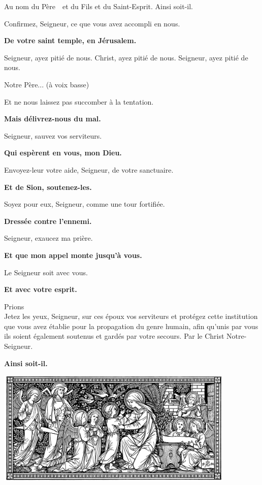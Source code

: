


\vspace*{0.5cm}
Au nom du Père~\x\ et du Fils et du Saint-Esprit. Ainsi soit-il.

\V Confirmez, Seigneur, ce que vous avez accompli en nous.

\R \textbf{De votre saint temple, en Jérusalem.}

Seigneur, ayez pitié de nous.
Christ, ayez pitié de nous.
Seigneur, ayez pitié de nous.

Notre Père... (à voix basse)

\V Et ne nous laissez pas succomber à la tentation. 

\R \textbf{Mais délivrez-nous du mal.}

\V Seigneur, sauvez vos serviteurs.

\R \textbf{Qui espèrent en vous, mon Dieu.}

\V Envoyez-leur votre aide, Seigneur, de votre sanctuaire.

\R\textbf{ Et de Sion, soutenez-les.}

\V Soyez pour eux, Seigneur, comme une tour fortifiée.

\R \textbf{Dressée contre l'ennemi.}

\V Seigneur, exaucez ma prière.

\R \textbf{Et que mon appel monte jusqu'à vous.}

\V Le Seigneur soit avec vous.

\R \textbf{Et avec votre esprit.}

Prions\\
Jetez les yeux, Seigneur, sur ces époux vos serviteurs et protégez cette institution que vous avez établie pour la propagation du genre humain, afin qu'unis par vous ils soient également soutenus et gardés par votre secours. Par le Christ Notre-Seigneur.

\R \textbf{Ainsi soit-il.}
\vspace*{3cm}
\begin{center}
\includegraphics[height=5.5cm]{images/SainteFamille}
\end{center}